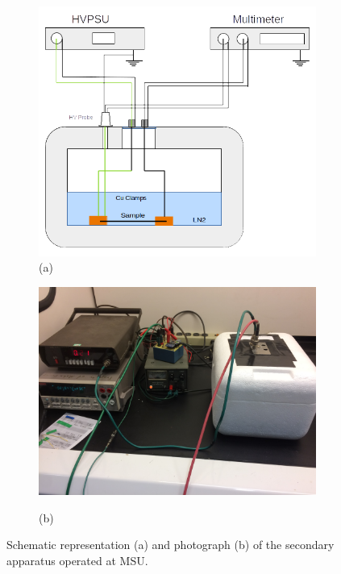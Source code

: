 \documentclass[a4paper,12pt]{article}
\begin{document}
\begin{figure}[htb]
\centering
\begin{subfigure}[c]{0.59\linewidth}
	\begin{center}
		\includegraphics[width=\linewidth]{MSU_styro_setup.png}
		(a)
	\end{center}
\end{subfigure}
\begin{subfigure}[c]{0.39\linewidth}
	\begin{center}
		\vspace*{4em} 
		
		\includegraphics[width=\linewidth]{MSU_styro_setup_picture.jpg}
		\vspace*{3em} 
		
		(b)
	\end{center}
\end{subfigure}
\caption{Schematic representation (a) and photograph (b) of the secondary apparatus operated at MSU.}
\label{fig:msu_styro_setup}
\end{figure}
\end{document}
